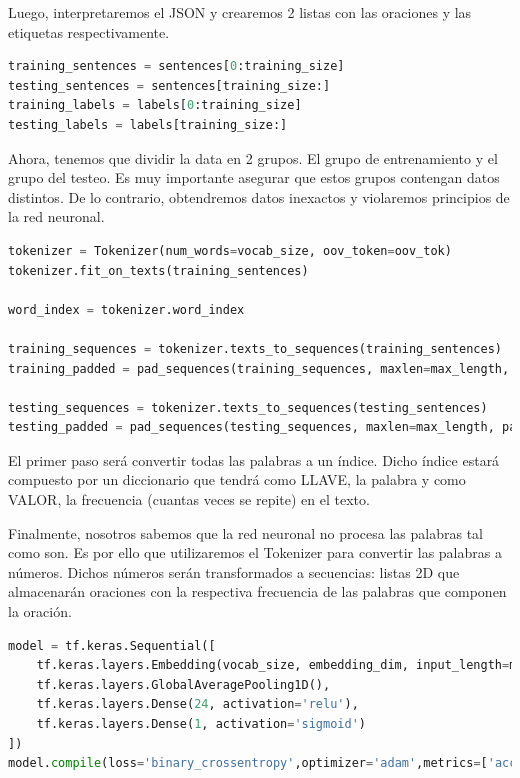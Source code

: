 Luego, interpretaremos el JSON y crearemos 2 listas con las oraciones y las etiquetas respectivamente.

\begin{lstlisting}[style= mystyle, language=Python]
training_sentences = sentences[0:training_size]
testing_sentences = sentences[training_size:]
training_labels = labels[0:training_size]
testing_labels = labels[training_size:]
\end{lstlisting}

Ahora, tenemos que dividir la data en 2 grupos. El grupo de entrenamiento y el grupo del testeo. Es muy importante asegurar que estos grupos contengan datos distintos. De lo contrario, obtendremos datos inexactos y violaremos principios de la red neuronal. 

\begin{lstlisting}[style= mystyle, language=Python]
tokenizer = Tokenizer(num_words=vocab_size, oov_token=oov_tok)
tokenizer.fit_on_texts(training_sentences)

word_index = tokenizer.word_index

training_sequences = tokenizer.texts_to_sequences(training_sentences)
training_padded = pad_sequences(training_sequences, maxlen=max_length, padding=padding_type, truncating=trunc_type)

testing_sequences = tokenizer.texts_to_sequences(testing_sentences)
testing_padded = pad_sequences(testing_sequences, maxlen=max_length, padding=padding_type, truncating=trunc_type)
\end{lstlisting}

El primer paso será convertir todas las palabras a un índice. Dicho índice estará compuesto por un diccionario que tendrá como LLAVE, la palabra y como VALOR, la frecuencia (cuantas veces se repite) en el texto.

Finalmente, nosotros sabemos que la red neuronal no procesa las palabras tal como son. Es por ello que utilizaremos el Tokenizer para convertir las palabras a números. Dichos números serán transformados a secuencias: listas 2D que almacenarán oraciones con la respectiva frecuencia de las palabras que componen la oración. 

\begin{lstlisting}[style= mystyle, language=Python]
model = tf.keras.Sequential([
    tf.keras.layers.Embedding(vocab_size, embedding_dim, input_length=max_length),
    tf.keras.layers.GlobalAveragePooling1D(),
    tf.keras.layers.Dense(24, activation='relu'),
    tf.keras.layers.Dense(1, activation='sigmoid')
])
model.compile(loss='binary_crossentropy',optimizer='adam',metrics=['accuracy'])
\end{lstlisting}


